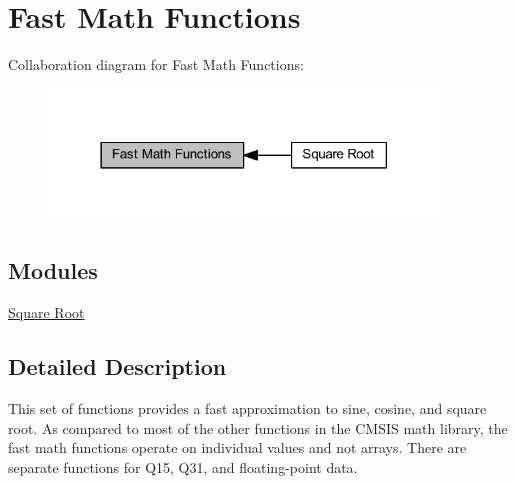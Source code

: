 \hypertarget{group__group_fast_math}{}\section{Fast Math Functions}
\label{group__group_fast_math}
Collaboration diagram for Fast Math Functions\+:
\nopagebreak
\begin{figure}[H]
\begin{center}
\leavevmode
\includegraphics[width=294pt]{group__group_fast_math}
\end{center}
\end{figure}
\subsection*{Modules}
\begin{DoxyCompactItemize}
\item 
\hyperlink{group___s_q_r_t}{Square Root}
\end{DoxyCompactItemize}


\subsection{Detailed Description}
This set of functions provides a fast approximation to sine, cosine, and square root. As compared to most of the other functions in the C\+M\+S\+IS math library, the fast math functions operate on individual values and not arrays. There are separate functions for Q15, Q31, and floating-\/point data. 